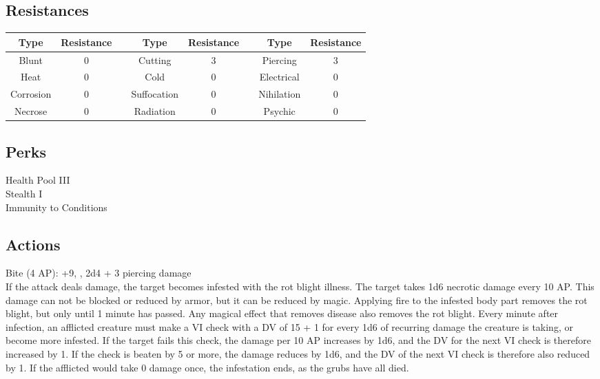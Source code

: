 \subsection{Resistances}
\begin{minipage}[H]{1\textwidth}
	\centering
	\begin{tabular}[c]{|c | c | c | c | c | c | c | c|}
		\hline
		Type & Resistance && Type & Resistance && Type & Resistance\\
		\hline
		Blunt & 0 &&
		Cutting & 3 &&
		Piercing & 3\\
		Heat & 0 &&
		Cold & 0 &&
		Electrical & 0\\
		Corrosion & 0 &&
		Suffocation & 0 &&
		Nihilation & 0 \\
		Necrose & 0 &&
		Radiation & 0 &&
		Psychic & 0\\
		\hline
	\end{tabular}
\end{minipage}

\subsection{Perks}
Health Pool III\\
Stealth I\\
Immunity to Conditions\\

\subsection{Actions}
Bite (4 AP): +9, , 2d4 + 3 piercing damage\\
If the attack deals damage, the target becomes infested with the rot blight illness.
The target takes 1d6 necrotic damage every 10 AP.
This damage can not be blocked or reduced by armor, but it can be reduced by magic.
Applying fire to the infested body part removes the rot blight, but only until 1 minute has passed.
Any magical effect that removes disease also removes the rot blight.
Every minute after infection, an afflicted creature must make a VI check with a DV of 15 + 1 for every 1d6 of recurring damage the creature is taking, or become more infested.
If the target fails this check, the damage per 10 AP increases by 1d6, and the DV for the next VI check is therefore increased by 1.
If the check is beaten by 5 or more, the damage reduces by 1d6, and the DV of the next VI check is therefore also reduced by 1.
If the afflicted would take 0 damage once, the infestation ends, as the grubs have all died.
\pagebreak